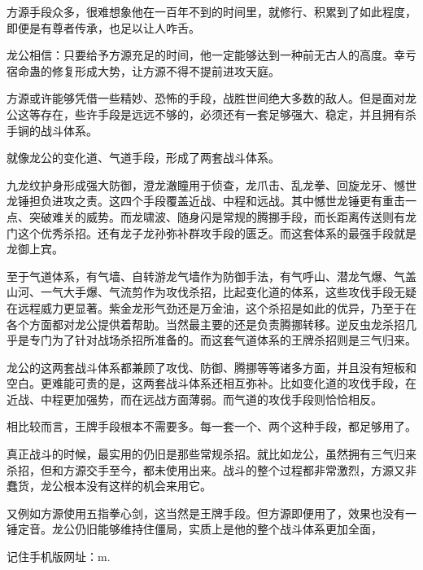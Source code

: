 \begin{this_body}
方源手段众多，很难想象他在一百年不到的时间里，就修行、积累到了如此程度，即便是有尊者传承，也足以让人咋舌。

龙公相信：只要给予方源充足的时间，他一定能够达到一种前无古人的高度。幸亏宿命蛊的修复形成大势，让方源不得不提前进攻天庭。

方源或许能够凭借一些精妙、恐怖的手段，战胜世间绝大多数的敌人。但是面对龙公这等存在，些许手段是远远不够的，必须还有一套足够强大、稳定，并且拥有杀手锏的战斗体系。

就像龙公的变化道、气道手段，形成了两套战斗体系。

九龙纹护身形成强大防御，澄龙澈瞳用于侦查，龙爪击、乱龙拳、回旋龙牙、憾世龙锤担负进攻之责。这四个手段覆盖近战、中程和远战。其中憾世龙锤更有重击一点、突破难关的威势。而龙啸波、随身闪是常规的腾挪手段，而长距离传送则有龙门这个优秀杀招。还有龙子龙孙弥补群攻手段的匮乏。而这套体系的最强手段就是龙御上宾。

至于气道体系，有气墙、自转游龙气墙作为防御手法，有气呼山、潜龙气爆、气盖山河、一气大手爆、气流剪作为攻伐杀招，比起变化道的体系，这些攻伐手段无疑在远程威力更显著。紫金龙形气劲还是万金油，这个杀招是如此的优异，乃至于在各个方面都对龙公提供着帮助。当然最主要的还是负责腾挪转移。逆反虫龙杀招几乎是专门为了针对战场杀招所准备的。而这套气道体系的王牌杀招则是三气归来。

龙公的这两套战斗体系都兼顾了攻伐、防御、腾挪等等诸多方面，并且没有短板和空白。更难能可贵的是，这两套战斗体系还相互弥补。比如变化道的攻伐手段，在近战、中程更加强势，而在远战方面薄弱。而气道的攻伐手段则恰恰相反。

相比较而言，王牌手段根本不需要多。每一套一个、两个这种手段，都足够用了。

真正战斗的时候，最实用的仍旧是那些常规杀招。就比如龙公，虽然拥有三气归来杀招，但和方源交手至今，都未使用出来。战斗的整个过程都非常激烈，方源又非蠢货，龙公根本没有这样的机会来用它。

又例如方源使用五指拳心剑，这当然是王牌手段。但方源即便用了，效果也没有一锤定音。龙公仍旧能够维持住僵局，实质上是他的整个战斗体系更加全面，

记住手机版网址：m.

\end{this_body}

